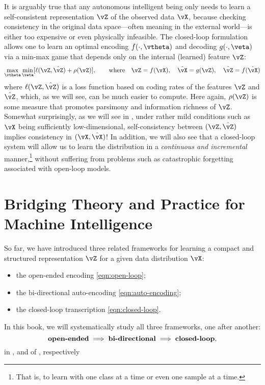 \documentclass[../../book-main.tex]{subfiles}
\begin{document}
It is arguably true that any autonomous intelligent being only needs to learn a self-consistent representation \(\vZ\) of the observed data \(\vX\), because checking consistency in the original data space---often meaning in the external world---is either too expensive or even physically infeasible. The closed-loop formulation allows one to learn an optimal encoding \(f(\cdot, \vtheta)\) and decoding \(g(\cdot, \veta)\) via a min-max game that depends only on the internal (learned) feature \(\vZ\):
\begin{equation}
    \max_{\vtheta}\min_{\veta} [\ell( \vZ, \hat{\vZ}) + \rho(\vZ)],  \qquad \text{where} \quad \vZ = f(\vX), \quad \hat{\vX} = g(\vZ), \quad \hat{\vZ} = f(\hat{\vX}) 
   \label{eqn:closed-loop-objective}
\end{equation}
where \(\ell( \vZ, \hat{\vZ})\) is a loss function based on coding rates of the features \(\vZ\) and \(\hat{\vZ}\), which, as we will see, can be much easier to compute. Here again, \(\rho(\vZ)\) is some measure that promotes parsimony and information richness of \(\vZ\). Somewhat surprisingly, as we will see in , under rather mild conditions such as \(\vX\) being sufficiently low-dimensional, self-consistency between \((\vZ, \hat{\vZ})\) implies consistency in \((\vX, \hat{\vX})\)! In addition, we will also see that a closed-loop system will allow us to learn the distribution in a \textit{continuous and incremental} manner,\footnote{That is, to learn with one class at a time or even one sample at a time.} without suffering from problems such as catastrophic forgetting associated with open-loop models.

\section{Bridging Theory and Practice for Machine Intelligence}
So far, we have introduced three related frameworks for learning a compact and structured representation \(\vZ\) for a given data distribution \(\vX\):
\begin{itemize}
    \item the open-ended encoding \eqref{eqn:open-loop};
    \item the bi-directional auto-encoding \eqref{eqn:auto-encoding};
    \item the closed-loop transcription \eqref{eqn:closed-loop}.
\end{itemize}
In this book, we will systematically study all three frameworks, one after another:
\begin{equation}
    \text{\textbf{open-ended}} \; \Longrightarrow \; 
    \text{\textbf{bi-directional}} \; \Longrightarrow \; \text{\textbf{closed-loop}},
\end{equation}
in ,  and  of , respectively
\end{document}

